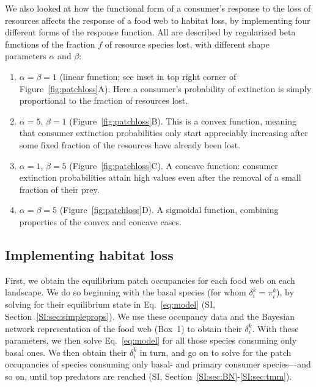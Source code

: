 \documentclass[11pt]{article}
\newcommand{\SI}{SI}
\begin{document}
We also looked at how the functional form of a consumer's response to the loss of resources affects the response of a food web to habitat loss, by implementing four different forms of the response function. All are described by regularized beta functions of the fraction $f$ of resource species lost, with different shape parameters $\alpha$ and $\beta$:
\begin{enumerate}
\item $\alpha = \beta = 1$ (linear function; see inset in top right corner of Figure~\ref{fig:patchloss}A). Here a consumer's probability of extinction is simply proportional to the fraction of resources lost.
\item $\alpha=5$, $\beta=1$ (Figure~\ref{fig:patchloss}B). This is a convex function, meaning that consumer extinction probabilities only start appreciably increasing after some fixed fraction of the resources have already been lost.
\item $\alpha=1$, $\beta=5$ (Figure~\ref{fig:patchloss}C). A concave function: consumer extinction probabilities attain high values even after the removal of a small fraction of their prey.
\item $\alpha = \beta = 5$ (Figure~\ref{fig:patchloss}D). A sigmoidal function, combining properties of the convex and concave cases.
\end{enumerate}


\subsection{Implementing habitat loss}

First, we obtain the equilibrium patch occupancies for each food web on each landscape. We do so beginning with the basal species (for whom $\delta_i^k = \pi_i^k$), by solving for their equilibrium state in Eq.~\ref{eq:model} (\SI, Section~\ref{SI:sec:simpleprops}). We use these occupancy data and the Bayesian network representation of the food web (Box~1) to obtain their $\delta_i^k$. With these parameters, we then solve Eq.~\ref{eq:model} for all those species consuming only basal ones. We then obtain their $\delta_i^k$ in turn, and go on to solve for the patch occupancies of species consuming only basal- and primary consumer species---and so on, until top predators are reached (\SI, Section~\ref{SI:sec:BN}-\ref{SI:sec:tmm}).
\end{document}
